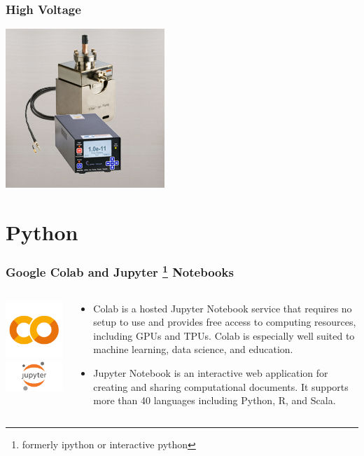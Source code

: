 \documentclass{beamer}
\begin{document}
\begin{frame}\frametitle{High Voltage}
\begin{center}
\includegraphics[width=6cm]{fig/highV.jpg}
\end{center}
\end{frame}

\section{Python}

\begin{frame}\frametitle{Google Colab and Jupyter \footnote{formerly ipython or interactive python} Notebooks}
\begin{columns}
\begin{column}{4cm}
\begin{center}
\includegraphics[width=3.5cm]{fig/colab.png}
\includegraphics[width=4cm]{fig/jupyter.png}
\end{center}
\end{column}
\begin{column}{7cm}
\begin{itemize}
\item Colab is a hosted Jupyter Notebook service that requires no setup to use and provides free access to computing resources, including GPUs and TPUs. Colab is especially well suited to machine learning, data science, and education.
\item Jupyter Notebook is an interactive web application for creating and sharing computational documents. It supports more than 40 languages including Python, R, and Scala.
\end{itemize}
\end{column}
\end{columns}
\end{frame}
\end{document}
